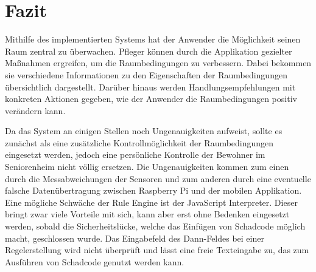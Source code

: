 \chapter{Fazit}

Mithilfe des implementierten Systems hat der Anwender die Möglichkeit seinen Raum zentral zu überwachen. Pfleger können durch die Applikation gezielter Maßnahmen ergreifen, um die Raumbedingungen zu verbessern. Dabei bekommen sie verschiedene Informationen zu den Eigenschaften der Raumbedingungen übersichtlich dargestellt. Darüber hinaus werden Handlungsempfehlungen mit konkreten Aktionen gegeben, wie der Anwender die Raumbedingungen positiv verändern kann. 
 
Da das System an einigen Stellen noch Ungenauigkeiten aufweist, sollte es zunächst als eine zusätzliche Kontrollmöglichkeit der Raumbedingungen eingesetzt werden, jedoch eine persönliche Kontrolle der Bewohner im Seniorenheim nicht völlig ersetzen. Die Ungenauigkeiten kommen zum einen durch die Messabweichungen der Sensoren und zum anderen durch eine eventuelle falsche Datenübertragung zwischen Raspberry Pi und der mobilen Applikation. \\
Eine mögliche Schwäche der Rule Engine ist der JavaScript Interpreter. Dieser bringt zwar viele Vorteile mit sich, kann aber erst ohne Bedenken eingesetzt werden, sobald die Sicherheitslücke, welche das Einfügen von Schadcode möglich macht, geschlossen wurde. Das Eingabefeld des Dann-Feldes bei einer Regelerstellung wird nicht überprüft und lässt eine freie Texteingabe zu, das zum Ausführen von Schadcode genutzt werden kann.
